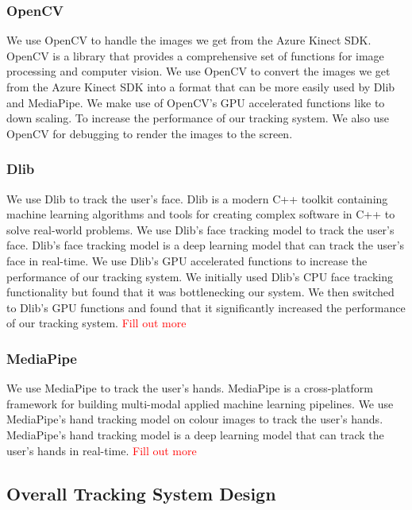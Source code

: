 \subsubsection{OpenCV}

We use OpenCV to handle the images we get from the Azure Kinect SDK. OpenCV is a library that provides a comprehensive set of functions for image processing and computer vision. We use OpenCV to convert the images we get from the Azure Kinect SDK into a format that can be more easily used by Dlib and MediaPipe. We make use of OpenCV's GPU accelerated functions like to down scaling. To increase the performance of our tracking system. We also use OpenCV for debugging to render the images to the screen.

\subsubsection{Dlib}

We use Dlib to track the user's face. Dlib is a modern C++ toolkit containing machine learning algorithms and tools for creating complex software in C++ to solve real-world problems. We use Dlib's face tracking model \tocite to track the user's face. Dlib's face tracking model is a deep learning model that can track the user's face in real-time. We use Dlib's GPU accelerated functions to increase the performance of our tracking system. We initially used Dlib's CPU face tracking functionality but found that it was bottlenecking our system. We then switched to Dlib's GPU functions and found that it significantly increased the performance of our tracking system. \textcolor{red}{Fill out more}

\subsubsection{MediaPipe}

We use MediaPipe to track the user's hands. MediaPipe is a cross-platform framework for building multi-modal applied machine learning pipelines. We use MediaPipe's hand tracking model \tocite on colour images to track the user's hands. MediaPipe's hand tracking model is a deep learning model that can track the user's hands in real-time. \textcolor{red}{Fill out more}


\subsection{Overall Tracking System Design}

